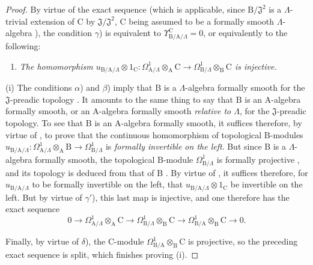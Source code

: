 \begin{proof}
By virtue of the exact sequence  (which is applicable, since $\mathrm{B}/\mathfrak{J}^2$ is a $\Lambda$-trivial extension of $\mathrm{C}$ by $\mathfrak{J}/\mathfrak{J}^2$, $\mathrm{C}$ being assumed to be a formally smooth $\Lambda$-algebra ), the condition $\gamma$) is equivalent to $\Upsilon^{\mathrm{C}}_{\mathrm{B}/\mathrm{A}/\Lambda}=0$, or equivalently to the following:
\begin{enumerate}
  \item[$\gamma'$)] \emph{The homomorphism $u_{\mathrm{B}/\mathrm{A}/\Lambda}\otimes 1_\mathrm{C}:\Omega^1_{\mathrm{A}/\Lambda}\otimes_\mathrm{A}\mathrm{C}\to\Omega^1_{\mathrm{B}/\Lambda}\otimes_\mathrm{B}\mathrm{C}$ is injective.}
\end{enumerate}

(i) The conditions $\alpha$) and $\beta$) imply that $\mathrm{B}$ is a $\Lambda$-algebra formally smooth for the $\mathfrak{J}$-preadic topology .
It amounts to the same thing to say that $\mathrm{B}$ is an $\mathrm{A}$-algebra formally smooth, or an $\mathrm{A}$-algebra formally smooth \emph{relative to $\Lambda$}, for the $\mathfrak{J}$-preadic topology.
To see that $\mathrm{B}$ is an $\mathrm{A}$-algebra formally smooth, it suffices therefore, by virtue of , to prove that the continuous homomorphism of topological $\mathrm{B}$-modules $u_{\mathrm{B}/\mathrm{A}/\Lambda}:\Omega^1_{\mathrm{A}/\Lambda}\otimes_\mathrm{A}\mathrm{B}\to\Omega^1_{\mathrm{B}/\Lambda}$ is \emph{formally invertible on the left}.
But since $\mathrm{B}$ is a $\Lambda$-algebra formally smooth, the topological $\mathrm{B}$-module $\Omega^1_{\mathrm{B}/\Lambda}$ is formally projective , and its topology is deduced from that of $\mathrm{B}$ .
By virtue of , it suffices therefore, for $u_{\mathrm{B}/\mathrm{A}/\Lambda}$ to be formally invertible on the left, that $u_{\mathrm{B}/\mathrm{A}/\Lambda}\otimes 1_\mathrm{C}$ be invertible on the left.
But by virtue of $\gamma'$), this last map is injective, and one therefore has the exact sequence 
\[
  0\to\Omega^1_{\mathrm{A}/\Lambda}\otimes_\mathrm{A}\mathrm{C}\to\Omega^1_{\mathrm{B}/\Lambda}\otimes_\mathrm{B}\mathrm{C}\to\Omega^1_{\mathrm{B}/\mathrm{A}}\otimes_\mathrm{B}\mathrm{C}\to 0.
\]

Finally, by virtue of $\delta$), the $\mathrm{C}$-module $\Omega^1_{\mathrm{B}/\mathrm{A}}\otimes_\mathrm{B}\mathrm{C}$ is projective, so the preceding exact sequence is split, which finishes proving (i).


\end{proof}
